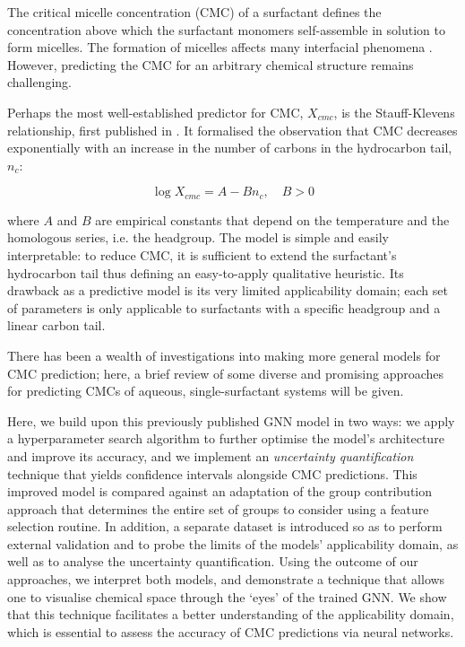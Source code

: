 The critical micelle concentration (CMC) of a surfactant defines the
concentration above which the surfactant monomers self-assemble in solution to
form micelles. The formation of micelles affects many interfacial phenomena
\cite{rosenSurfactantsInterfacialPhenomena2012}. However, predicting the CMC for
an arbitrary chemical structure remains challenging.

Perhaps the most well-established predictor for CMC, $X_{cmc}$, is the
Stauff-Klevens relationship, first published in
\citeyear{klevensStructureAggregationDilate1953}
\cite{klevensStructureAggregationDilate1953}. It formalised the observation that
CMC decreases exponentially with an increase in the number of carbons in the
hydrocarbon tail, $n_c$:

\begin{equation}
    \label{eq:klevens}
    \log X_{cmc} = A - Bn_c, \quad B > 0
\end{equation}

where $A$ and $B$ are empirical constants that depend on the temperature and the
homologous series, i.e. the headgroup. The model is simple and easily
interpretable: to reduce CMC, it is sufficient to extend the surfactant's
hydrocarbon tail thus defining an easy-to-apply qualitative heuristic. Its
drawback as a predictive model is its very limited applicability domain; each
set of parameters is only applicable to surfactants with a specific headgroup
and a linear carbon tail.

There has been a wealth of investigations into making more general models for
CMC prediction; here, a brief review of some diverse and promising approaches
for predicting CMCs of aqueous, single-surfactant systems will be given.



Here, we build upon this previously published GNN model
\cite{qinPredictingCriticalMicelle2021} in two ways: we apply a hyperparameter
search algorithm to further optimise the model's architecture and improve its
accuracy, and we implement an \emph{uncertainty quantification} technique that
yields confidence intervals alongside CMC predictions. This improved model is
compared against an adaptation of the group contribution approach that
determines the entire set of groups to consider using a feature selection
routine. In addition, a separate dataset is introduced so as to perform external
validation and to probe the limits of the models' applicability domain, as well
as to analyse the uncertainty quantification. Using the outcome of our
approaches, we interpret both models, and demonstrate a technique that allows
one to visualise chemical space through the `eyes' of the trained GNN. We show
that this technique facilitates a better understanding of the applicability
domain, which is essential to assess the accuracy of CMC predictions via neural
networks.